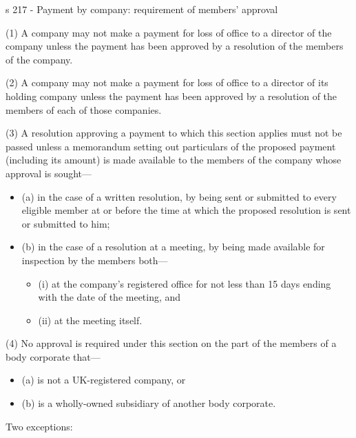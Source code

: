 \documentclass[
]{article}
\providecommand{\tightlist}{%
  \setlength{\itemsep}{0pt}\setlength{\parskip}{0pt}}
\newenvironment{env-136e818f-6bd8-45c9-b7d8-e6b8925f9e62}
{
    \savenotes\tcolorbox[blanker,breakable,left=5pt,borderline west={2pt}{-4pt}{green}]
}
{
    \endtcolorbox\spewnotes
}
\begin{document}
\begin{env-136e818f-6bd8-45c9-b7d8-e6b8925f9e62}

s 217 - Payment by company: requirement of members' approval

(1) A company may not make a payment for loss of office to a director of
the company unless the payment has been approved by a resolution of the
members of the company.

(2) A company may not make a payment for loss of office to a director of
its holding company unless the payment has been approved by a resolution
of the members of each of those companies.

(3) A resolution approving a payment to which this section applies must
not be passed unless a memorandum setting out particulars of the
proposed payment (including its amount) is made available to the members
of the company whose approval is sought---

\begin{itemize}
\tightlist
\item
  (a) in the case of a written resolution, by being sent or submitted to
  every eligible member at or before the time at which the proposed
  resolution is sent or submitted to him;
\item
  (b) in the case of a resolution at a meeting, by being made available
  for inspection by the members both---

  \begin{itemize}
  \tightlist
  \item
    (i) at the company's registered office for not less than 15 days
    ending with the date of the meeting, and
  \item
    (ii) at the meeting itself.
  \end{itemize}
\end{itemize}

(4) No approval is required under this section on the part of the
members of a body corporate that---

\begin{itemize}
\tightlist
\item
  (a) is not a UK-registered company, or
\item
  (b) is a wholly-owned subsidiary of another body corporate.
\end{itemize}

\end{env-136e818f-6bd8-45c9-b7d8-e6b8925f9e62}

Two exceptions:
\end{document}
